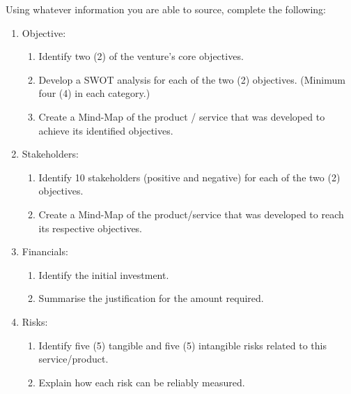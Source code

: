 \documentclass[12pt]{article}
\begin{document}
Using whatever information you are able to source, complete the following: 
 \begin{enumerate}
 	\item Objective:
 			\begin{enumerate}
 				\item Identify two (2) of the venture’s core objectives.
 				\item Develop a SWOT analysis for each of the two (2) objectives. (Minimum four (4) in each category.)
 				\item Create a Mind-Map of the product / service that was developed to achieve its identified objectives.
 			\end{enumerate}
 			\newpage
 	\item Stakeholders:
 			\begin{enumerate}
 				\item Identify 10 stakeholders (positive and negative) for each of the two (2) objectives. 
 				\item Create a Mind-Map of the product/service that was developed to reach its respective objectives.
 			\end{enumerate}
 	\item Financials:
 			\begin{enumerate}
 				\item Identify the initial investment.
 				\item Summarise the justification for the amount required.
 			\end{enumerate}
 	\item Risks:
 			\begin{enumerate}
 				\item Identify five (5) tangible and five (5) intangible risks related to this service/product.
 				\item Explain how each risk can be reliably measured.
 			\end{enumerate}
 \end{enumerate}
 
 
 
\end{document}
